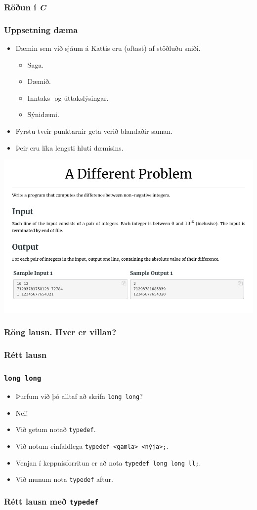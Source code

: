 \documentclass[handout]{beamer}
\newcommand\env[2]
{
	\begin{#1}
	#2
	\end{#1}
}
\newcommand\code[1]{\tiny}
\begin{document}
\env{frame}
{
	\frametitle{Röðun í \emph{C}}
	\code{sort.c}
}

\env{frame}
{
	\frametitle{Uppsetning dæma}
	\env{itemize}
	{
		\item<1-> Dæmin sem við sjáum á Kattis eru (oftast) af stöðluðu sniði.
		\env{itemize}
		{
			\item<2-> Saga.
			\item<3-> Dæmið.
			\item<4-> Inntaks -og úttakslýsingar.
			\item<5-> Sýnidæmi.
		}
		\item<6-> Fyrstu tveir punktarnir geta verið blandaðir saman.
		\item<7-> Þeir eru líka lengsti hluti dæmisins.
	}
}
\env{frame}
{
	\includegraphics[scale = 0.38]{daemi}
}

\env{frame}
{
	\frametitle{Röng lausn. Hver er villan?}
	\code{differentint.cpp}
}

\env{frame}
{
	\frametitle{Rétt lausn}
	\code{different.cpp}
}

\env{frame}
{
	\frametitle{\texttt{long long}}
	\env{itemize}
	{
		\item<1-> Þurfum við þó alltaf að skrifa \texttt{long long}?
		\item<2-> Nei!
		\item<3-> Við getum notað \texttt{typedef}.
		\item<4-> Við notum einfaldlega \texttt{typedef <gamla> <nýja>;}.
		\item<5-> Venjan í keppnisforritun er að nota \texttt{typedef long long ll;}.
		\item<6-> Við munum nota \texttt{typedef} aftur.
	}
}

\env{frame}
{
	\frametitle{Rétt lausn með \texttt{typedef}}
	\code{differentll.cpp}
}
\end{document}
